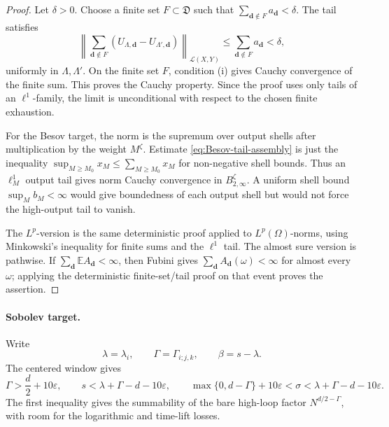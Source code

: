 \documentclass[11pt,reqno]{amsart}
\numberwithin{equation}{section}
\theoremstyle{plain}
\theoremstyle{definition}
\newcommand{\E}{\mathbb E}
\newcommand{\eps}{\varepsilon}
\begin{document}
\begin{proof}
Let \(\delta>0\).  Choose a finite set \(F\subset\mathfrak D\) such that \(\sum_{\mathbf d\notin F}a_{\mathbf d}<\delta\).  The tail satisfies
\[
        \left\|\sum_{\mathbf d\notin F}
        (U_{\Lambda,\mathbf d}-U_{\Lambda',\mathbf d})\right\|_{\mathcal L(X,Y)}
        \le \sum_{\mathbf d\notin F}a_{\mathbf d}<\delta,
\]
uniformly in \(\Lambda,\Lambda'\).  On the finite set \(F\), condition (i) gives Cauchy convergence of the finite sum.  This proves the Cauchy property.  Since the proof uses only tails of an \(\ell^1\)-family, the limit is unconditional with respect to the chosen finite exhaustion.

For the Besov target, the norm is the supremum over output shells after multiplication by the weight \(M^\zeta\).  Estimate \eqref{eq:Besov-tail-assembly} is just the inequality \(\sup_{M\ge M_0}x_M\le\sum_{M\ge M_0}x_M\) for non-negative shell bounds.  Thus an \(\ell^1_M\) output tail gives norm Cauchy convergence in \(B_{2,\infty}^\zeta\).  A uniform shell bound \(\sup_M b_M<\infty\) would give boundedness of each output shell but would not force the high-output tail to vanish.

The \(L^p\)-version is the same deterministic proof applied to \(L^p(\Omega)\)-norms, using Minkowski's inequality for finite sums and the \(\ell^1\) tail.  The almost sure version is pathwise.  If \(\sum_{\mathbf d}\E A_{\mathbf d}<\infty\), then Fubini gives \(\sum_{\mathbf d}A_{\mathbf d}(\omega)<\infty\) for almost every \(\omega\); applying the deterministic finite-set/tail proof on that event proves the assertion.
\end{proof}

\paragraph{Sobolev target.}
Write
\[
        \lambda=\lambda_i,\qquad \Gamma=\Gamma_{i;j,k},\qquad \beta=s-\lambda .
\]
The centered window gives
\begin{equation}\label{eq:window-short}
        \Gamma>\frac d2+10\eps,
        \qquad
        s<\lambda+\Gamma-d-10\eps,
        \qquad
        \max\{0,d-\Gamma\}+10\eps<\sigma<\lambda+\Gamma-d-10\eps .
\end{equation}
The first inequality gives the summability of the bare high-loop factor \(N^{d/2-\Gamma}\), with room for the logarithmic and time-lift losses.
\end{document}
